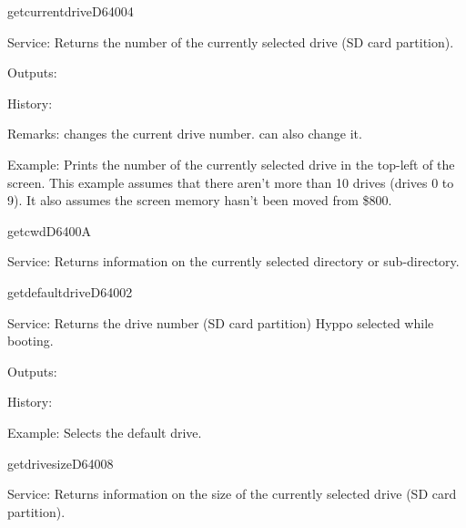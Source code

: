 \newpage
\begin{hyppotrap}{getcurrentdrive}{D640}{04}
\item [Service:]
  Returns the number of the currently selected drive (SD card partition).
\item [Outputs:]
\item [History:]
\item [Remarks:]
   changes the current drive number. 
  can also change it.
\item [Example:]
  Prints the number of the currently selected drive in the top-left of the
  screen. This example assumes that there aren't more than 10 drives (drives
  0 to 9). It also assumes the screen memory hasn't been moved from \$800.
\end{hyppotrap}


\newpage
\begin{hyppotrap}{getcwd}{D640}{0A}
\item [Service:]
  Returns information on the currently selected directory or sub-directory.
\notimplemented
\end{hyppotrap}


\newpage
\begin{hyppotrap}{getdefaultdrive}{D640}{02}
\item [Service:]
  Returns the drive number (SD card partition) Hyppo selected while
  booting.
\item [Outputs:]
\item [History:]
\item [Example:]
  Selects the default drive.
\end{hyppotrap}


\newpage
\begin{hyppotrap}{getdrivesize}{D640}{08}
\item [Service:]
  Returns information on the size of the currently selected drive (SD card
  partition).
\notimplemented
\end{hyppotrap}



